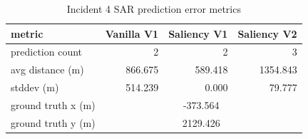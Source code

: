 \begin{table}[ht]
\centering
\caption{Incident 4 SAR prediction error metrics}
\label{tab:sar-incident-4}
\begin{tabular}{lrrr}
\hline
metric & Vanilla V1 & Saliency V1 & Saliency V2 \\
\hline
prediction count & 2 & 2 & 3 \\
avg distance (m) & 866.675 & 589.418 & 1354.843 \\
stddev (m) & 514.239 & 0.000 & 79.777 \\
ground truth x (m) & \multicolumn{3}{c}{-373.564} \\
ground truth y (m) & \multicolumn{3}{c}{2129.426} \\
\hline
\end{tabular}
\end{table}
